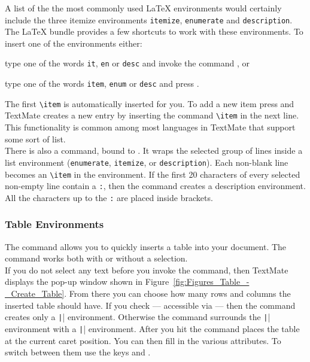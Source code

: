 \documentclass[11pt, x11names]{article}
\begin{document}
A list of the the most commonly used LaTeX environments would certainly include the three itemize environments \texttt{itemize}, \texttt{enumerate} and \texttt{description}. The LaTeX bundle provides a few shortcuts to work with these environments. To insert one of the environments either:

\begin{enumerate}

  \begin{sloppypar}
  \item type one of the words \texttt{it}, \texttt{en} or \texttt{desc} and invoke the command , or
  \end{sloppypar}

  \item type one of the words \texttt{item}, \texttt{enum} or \texttt{desc} and press \keys{\tab}.

\end{enumerate}

The first \texttt{\textbackslash{}item} is automatically inserted for you. To add a new item press \keys{\enter} and TextMate creates a new entry by inserting the command \texttt{\textbackslash{}item} in the next line. This functionality is common among most languages in TextMate that support some sort of list.\\

There is also a  command, bound to . It wraps the selected group of lines inside a list environment (\texttt{enumerate}, \texttt{itemize}, or \texttt{description}). Each non-blank line becomes an \texttt{\textbackslash{}item} in the environment. If the first 20 characters of every selected non-empty line contain a \texttt{:}, then the command creates a description environment. All the characters up to the \texttt{:} are placed inside brackets.

\subsubsection{Table Environments}

The command  allows you to quickly inserts a table into your document. The command works both with or without a selection.\\

If you do not select any text before you invoke the command, then TextMate displays the pop-up window shown in Figure~\ref{fig:Figures_Table_-_Create_Table}. From there you can choose how many rows and columns the inserted table should have. If you check  — accessible via  — then the command creates only a \texttt|\tabular| environment. Otherwise the command surrounds the \texttt|\tabular| environment with a \texttt|\table| environment. After you hit  the command places the table at the current caret position. You can then fill in the various attributes. To switch between them use the keys \keys{\tab} and \keys{\shift + \tab}.
\end{document}
